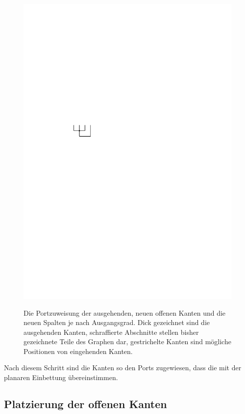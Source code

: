 \documentclass[a4paper]{scrreprt}
\theoremstyle{definition}
\begin{document}
\begin{figure}[h]
            {\includegraphics[scale=.8]{oc3_embed/outgoing/outdeg4}}

        \caption{Die Portzuweisung der ausgehenden, neuen offenen Kanten und die neuen Spalten je nach Ausgangsgrad. Dick gezeichnet sind die ausgehenden Kanten, schraffierte Abschnitte stellen bisher gezeichnete Teile des Graphen dar, gestrichelte Kanten sind mögliche Positionen von eingehenden Kanten.}
        \label{fig:embedout}
\end{figure}

Nach diesem Schritt sind die Kanten so den Ports zugewiesen, dass die mit der planaren Einbettung übereinstimmen.

\subsection{Platzierung der offenen Kanten}
\end{document}
